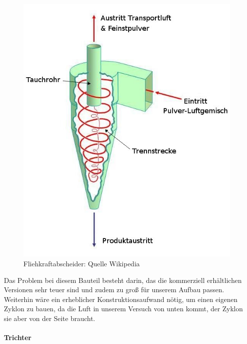 \begin{figure}[h]
	\begin{center}
		\includegraphics[scale=0.5]{Umsetzung_Fliehkraftabscheider.jpg}
		\caption{Fliehkraftabscheider: Quelle Wikipedia}
	\end{center}
\end{figure}



Das Problem bei diesem Bauteil besteht darin, das die kommerziell erhältlichen Versionen sehr teuer sind und zudem zu groß für unserem Aufbau passen. \\
Weiterhin wäre ein erheblicher Konstruktionsaufwand nötig, um einen eigenen Zyklon zu bauen, da die Luft in unserem Versuch von unten kommt, der Zyklon sie aber von der Seite braucht. \\

\paragraph{Trichter}

\hfill \\

